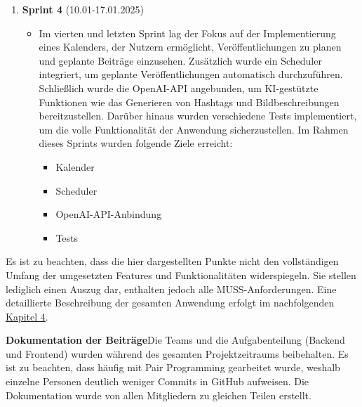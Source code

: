 \begin{enumerate}
    \item \textbf{Sprint 4} (10.01-17.01.2025)
    \begin{itemize}
        \item Im vierten und letzten Sprint lag der Fokus auf der Implementierung eines Kalenders, der Nutzern ermöglicht, Veröffentlichungen zu planen und geplante Beiträge einzusehen. Zusätzlich wurde ein Scheduler integriert, 
        um geplante Veröffentlichungen automatisch durchzuführen. Schließlich wurde die OpenAI-\ac{API} angebunden, um KI-gestützte Funktionen wie das Generieren von Hashtags und Bildbeschreibungen bereitzustellen. Darüber hinaus 
        wurden verschiedene Tests implementiert, um die volle Funktionalität der Anwendung sicherzustellen. Im Rahmen dieses Sprints wurden folgende Ziele erreicht:
        \begin{itemize}
            \item Kalender
            \item Scheduler
            \item OpenAI-\ac{API}-Anbindung
            \item Tests
        \end{itemize}
    \end{itemize}
\end{enumerate}

Es ist zu beachten, dass die hier dargestellten Punkte nicht den vollständigen Umfang der umgesetzten Features und Funktionalitäten widerspiegeln. Sie stellen lediglich einen Auszug dar, enthalten jedoch alle MUSS-Anforderungen. 
Eine detaillierte Beschreibung der gesamten Anwendung erfolgt im nachfolgenden \hyperref[sec:chapter4]{Kapitel 4}.

\textbf{Dokumentation der Beiträge}\quad Die Teams und die Aufgabenteilung (Backend und Frontend) wurden während des gesamten Projektzeitraums beibehalten. Es ist zu beachten, dass häufig mit Pair Programming gearbeitet wurde, 
weshalb einzelne Personen deutlich weniger Commits in GitHub aufweisen. Die Dokumentation wurde von allen Mitgliedern zu gleichen Teilen erstellt.  